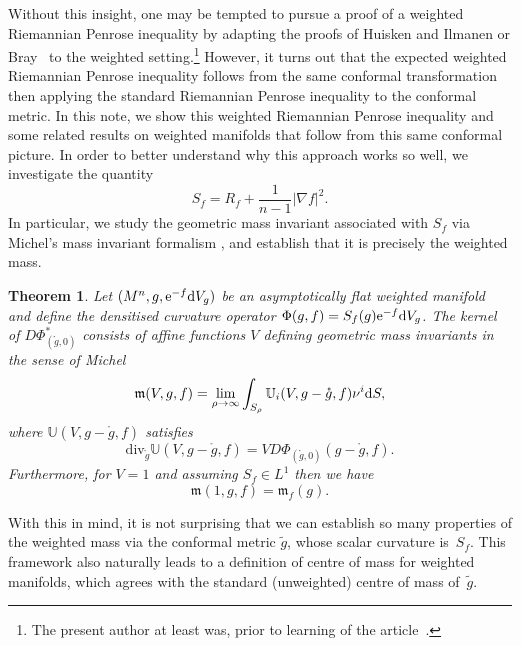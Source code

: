 \documentclass[pdftex]{sigma}
\numberwithin{equation}{section}
\newtheorem{Theorem}{Theorem}[section]
\theoremstyle{definition}
\begin{document}
Without this insight, one may be tempted to pursue a proof of a weighted Riemannian Penrose inequality by adapting the proofs of Huisken and Ilmanen \cite{HuiskenIlmanen01} or Bray~\cite{Bray01} to the weighted setting.\footnote{The present author at least was, prior to learning of the article~\cite{LawLopezSantiago24}.} However, it turns out that the expected weighted Riemannian Penrose inequality follows from the same conformal transformation then applying the standard Riemannian Penrose inequality to the conformal metric. In this note, we show this weighted Riemannian Penrose inequality and some related results on weighted manifolds that follow from this same conformal picture. In order to better understand why this approach works so well, we investigate the quantity
\[
S_f=R_f+\frac{1}{n-1}|\nabla f|^2.
\] In particular, we study the geometric mass invariant associated with $S_f$ via Michel's mass invariant formalism \cite{Michel11}, and establish that it is precisely the weighted mass.
\begin{Theorem}\label{thm-Michel}
	Let $(M^n,g,{\rm e}^{-f}{\rm d}V_g)$ be an asymptotically flat weighted manifold and define the densitised curvature operator $\Phi(g,f)=S_f(g) {\rm e}^{-f}{\rm d}V_g$. The kernel of $D\Phi^*_{(\mathring g,0)}$ consists of affine functions $V$ defining geometric mass invariants in the sense of Michel~{\rm \cite{Michel11}}
	\begin{equation*}
		\mathfrak{m}(V,g,f)=\lim_{\rho\to\infty}\int_{S_\rho}\mathbb U_i(V,g-\mathring g,f) \nu^i{\rm d}S,
	\end{equation*}
	where $\mathbb U(V,g-\mathring g,f)$ satisfies
	\[
		\mathrm{div}_{\mathring g}\mathbb U(V,g-\mathring g,f)=V  D\Phi_{(\mathring g,0)}(g-\mathring g,f).
	\]
	Furthermore, for $V=1$ and assuming $S_f\in L^1$ then we have
	\[
		\mathfrak{m}(1,g,f)=\mathfrak{m}_f(g).
	\]
\end{Theorem}

With this in mind, it is not surprising that we can establish so many properties of the weighted mass via the conformal metric $\widetilde g$, whose scalar curvature is~$S_f$. This framework also naturally leads to a definition of centre of mass for weighted manifolds, which agrees with the standard (unweighted) centre of mass of~$\widetilde g$.
\end{document}
